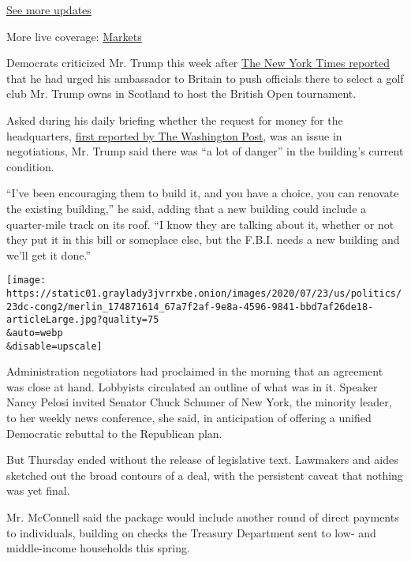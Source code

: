 \href{https://www.nytimes3xbfgragh.onion/2020/08/04/world/coronavirus-covid-19.html?action=click\&pgtype=Article\&state=default\&region=MAIN_CONTENT_1\&context=storylines_live_updates}{See
more updates}

More live coverage:
\href{https://www.nytimes3xbfgragh.onion/live/2020/08/03/business/stock-market-today-coronavirus?action=click\&pgtype=Article\&state=default\&region=MAIN_CONTENT_1\&context=storylines_live_updates}{Markets}

Democrats criticized Mr. Trump this week after
\href{https://www.nytimes3xbfgragh.onion/2020/07/21/world/europe/trump-british-open.html}{The
New York Times reported} that he had urged his ambassador to Britain to
push officials there to select a golf club Mr. Trump owns in Scotland to
host the British Open tournament.

Asked during his daily briefing whether the request for money for the
headquarters,
\href{https://www.washingtonpost.com/us-policy/2020/07/23/congress-stimulus-coronavirus-trump/?hpid=hp_hp-top-table-high_virushill-9am\%3Ahomepage\%2Fstory-ans}{first
reported by The Washington Post}, was an issue in negotiations, Mr.
Trump said there was ``a lot of danger'' in the building's current
condition.

``I've been encouraging them to build it, and you have a choice, you can
renovate the existing building,'' he said, adding that a new building
could include a quarter-mile track on its roof. ``I know they are
talking about it, whether or not they put it in this bill or someplace
else, but the F.B.I. needs a new building and we'll get it done.''

\texttt{[image: https://static01.graylady3jvrrxbe.onion/images/2020/07/23/us/politics/23dc-cong2/merlin\_174871614\_67a7f2af-9e8a-4596-9841-bbd7af26de18-articleLarge.jpg?quality=75\\\&auto=webp\\\&disable=upscale]}

Administration negotiators had proclaimed in the morning that an
agreement was close at hand. Lobbyists circulated an outline of what was
in it. Speaker Nancy Pelosi invited Senator Chuck Schumer of New York,
the minority leader, to her weekly news conference, she said, in
anticipation of offering a unified Democratic rebuttal to the Republican
plan.

But Thursday ended without the release of legislative text. Lawmakers
and aides sketched out the broad contours of a deal, with the persistent
caveat that nothing was yet final.

Mr. McConnell said the package would include another round of direct
payments to individuals, building on checks the Treasury Department sent
to low- and middle-income households this spring.

